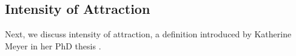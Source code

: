 \subsection{Intensity of Attraction}

Next, we discuss intensity of attraction, a definition introduced by Katherine Meyer in her PhD thesis \cite{meyerMetricPropertiesAttractors2019}. 